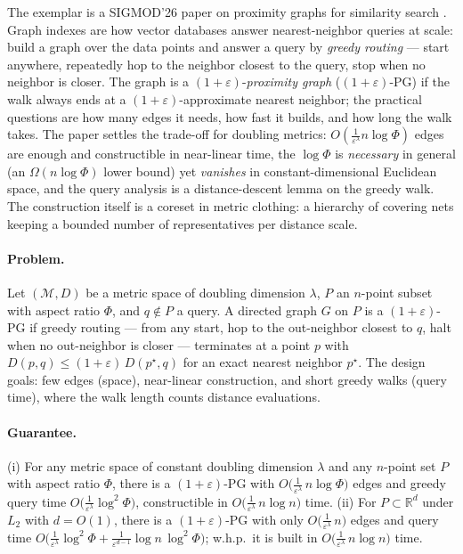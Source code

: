 The exemplar is a SIGMOD'26 paper on proximity graphs for similarity
search \citep{sigmod26-349}. Graph indexes are how vector databases
answer nearest-neighbor queries at scale: build a graph over the data
points and answer a query by \emph{greedy routing} --- start anywhere,
repeatedly hop to the neighbor closest to the query, stop when no
neighbor is closer. The graph is a $(1+\varepsilon)$-\emph{proximity
graph} ($(1+\varepsilon)$-PG) if the walk always ends at a
$(1+\varepsilon)$-approximate nearest neighbor; the practical questions
are how many edges it needs, how fast it builds, and how long the walk
takes. The paper settles the trade-off for doubling metrics:
$O(\tfrac{1}{\varepsilon^\lambda} n\log\Phi)$ edges are enough and
constructible in near-linear time, the $\log\Phi$ is \emph{necessary}
in general (an $\Omega(n\log\Phi)$ lower bound) yet \emph{vanishes} in
constant-dimensional Euclidean space, and the query analysis is a
distance-descent lemma on the greedy walk. The construction itself is
a coreset in metric clothing: a hierarchy of covering nets keeping a
bounded number of representatives per distance scale.

\paragraph{Problem.}
Let $(\mathcal{M}, D)$ be a metric space of doubling dimension
$\lambda$, $P$ an $n$-point subset with aspect ratio $\Phi$, and
$q \notin P$ a query. A directed graph $G$ on $P$ is a
$(1+\varepsilon)$-PG if greedy routing --- from any start, hop to the
out-neighbor closest to $q$, halt when no out-neighbor is closer ---
terminates at a point $p$ with $D(p,q) \le (1+\varepsilon)\,
D(p^{\star},q)$ for an exact nearest neighbor $p^{\star}$. The design
goals: few edges (space), near-linear construction, and short greedy
walks (query time), where the walk length counts distance evaluations.

\paragraph{Guarantee.}

\begin{theorem}\label{thm:cor-pg-main}
(i) For any metric space of constant doubling dimension $\lambda$ and
any $n$-point set $P$ with aspect ratio $\Phi$, there is a
$(1+\varepsilon)$-PG with $O\bigl(\tfrac{1}{\varepsilon^\lambda}\,
n\log\Phi\bigr)$ edges and greedy query time
$O\bigl(\tfrac{1}{\varepsilon^\lambda}\log^2\Phi\bigr)$,
constructible in $O\bigl(\tfrac{1}{\varepsilon^\lambda}\,n\log n\bigr)$
time. (ii) For $P \subset \mathbb{R}^d$ under $L_2$ with $d = O(1)$,
there is a $(1+\varepsilon)$-PG with only
$O\bigl(\tfrac{1}{\varepsilon^\lambda}\,n\bigr)$ edges and query time
$O\bigl(\tfrac{1}{\varepsilon^\lambda}\log^2\Phi +
\tfrac{1}{\varepsilon^{d-1}}\log n\,\log^2\Phi\bigr)$; w.h.p.\ it is
built in $O\bigl(\tfrac{1}{\varepsilon^\lambda}\,n\log n\bigr)$ time.
\eop
\end{theorem}

